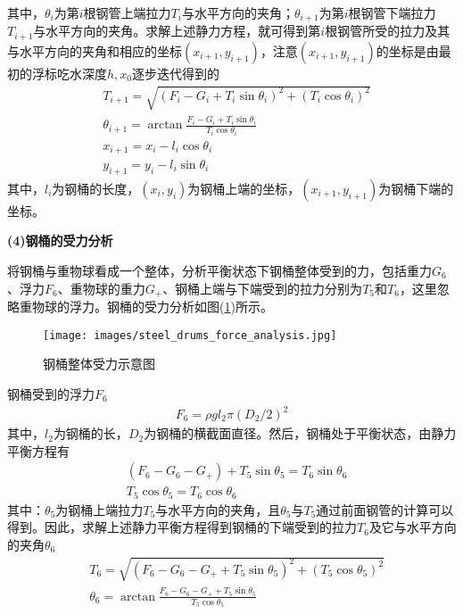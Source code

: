             其中，$\theta_i$为第$i$根钢管上端拉力$T_i$与水平方向的夹角；$\theta_{i+1}$为第$i$根钢管下端拉力$T_{i+1}$与水平方向的夹角。求解上述静力方程，就可得到第$i$根钢管所受的拉力及其与水平方向的夹角和相应的坐标$(x_{i+1},y_{i+1})$，注意$(x_{i+1},y_{i+1})$的坐标是由最初的浮标吃水深度$h,x_0$逐步迭代得到的
            \begin{align*}
            & T_{i+1} = \sqrt{(F_{i}-G_i + T_i\sin \theta_i)^2+(T_i\cos \theta_i)^2}\\
            & \theta_{i+1} = \arctan\frac{F_i - G_i + T_i \sin \theta_i}{T_i\cos \theta_i}\\
            & x_{i+1} = x_i - l_i\cos\theta_i\\
            & y_{i+1} = y_i - l_i\sin \theta_i
            \end{align*}
            其中，$l_i$为钢桶的长度，$(x_i,y_i)$为钢桶上端的坐标，$(x_{i+1},y_{i+1})$为钢桶下端的坐标。
            \par
            \textbf{(4)钢桶的受力分析}
            \par
            将钢桶与重物球看成一个整体，分析平衡状态下钢桶整体受到的力，包括重力$G_6$、浮力$F_6$、重物球的重力$G_+$、钢桶上端与下端受到的拉力分别为$T_5$和$T_6$，这里忽略重物球的浮力。钢桶的受力分析如图(\ref{fig:钢桶整体受力示意图})所示。
            \begin{figure}[H]
            \centering
            \texttt{[image: images/steel\_drums\_force\_analysis.jpg]}
            \caption{钢桶整体受力示意图}
            \label{fig:钢桶整体受力示意图}
            \end{figure}
            \par
            钢桶受到的浮力$F_6$
            \begin{align*}
            F_6 = \rho g l_2 \pi ( {D_2}/{2} ) ^2
            \end{align*}
            其中，$l_2$为钢桶的长，$D_2$为钢桶的横截面直径。然后，钢桶处于平衡状态，由静力平衡方程有
            \begin{align*}
            & (F_6 - G_6 - G_+) +T_5\sin \theta_5 = T_6\sin  \theta_6\\
            & T_5\cos\theta_5 = T_6\cos \theta_6
            \end{align*}
            其中：$\theta_5$为钢桶上端拉力$T_5$与水平方向的夹角，且$\theta_5$与$T_5$通过前面钢管的计算可以得到。因此，求解上述静力平衡方程得到钢桶的下端受到的拉力$T_6$及它与水平方向的夹角$\theta_6$
            \begin{align*}
            & T_6 = \sqrt{(F_6 - G_6 -G_+ +T_5\sin \theta_5)^2+(T_5\cos\theta_5)^2}\\
            & \theta_6 = \arctan \frac{F_6-G_6 - G_++T_5\sin \theta_5}{T_5\cos \theta_5}
            \end{align*}
